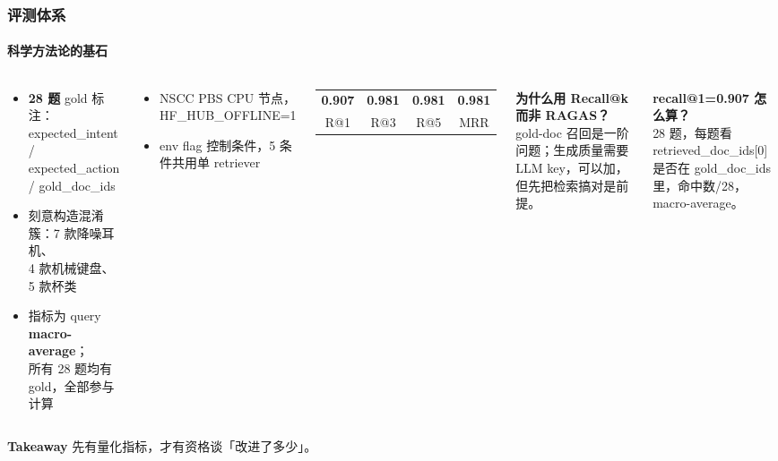 \documentclass[aspectratio=169,10pt]{beamer}
\newcommand{\takeaway}[1]{%
  \vfill%
  \begin{tcolorbox}[
    colback=Ctakebg, colframe=Ctakebg,
    arc=0pt, boxrule=0pt,
    left=7pt, right=7pt, top=4pt, bottom=4pt,
    width=\textwidth, nobeforeafter
  ]%
    {\scriptsize\color{white}\textbf{Takeaway}\enspace%
     \color{white!88!Ctakebg}#1}%
  \end{tcolorbox}%
}
\newcommand{\mono}[1]{{\ttfamily\small\color{Cblue!90!black}#1}}  %
\begin{document}
\begin{frame}
\frametitle{评测体系}
\framesubtitle{科学方法论的基石}

\begin{columns}[T]
\begin{tcolorbox}[tcgray, title={\color{Ctextdark}评测集设计}]
\small\begin{itemize}\setlength\itemsep{0.3em}
  \item \textbf{28 题} gold 标注：\\
    \mono{expected\_intent} / \mono{expected\_action}\\
    / \mono{gold\_doc\_ids}
  \item 刻意构造混淆簇：7 款降噪耳机、\\4 款机械键盘、5 款杯类
  \item 指标为 query \textbf{macro-average}；\\所有 28 题均有 gold，全部参与计算
\end{itemize}
\end{tcolorbox}
\vspace{0.2cm}
\begin{tcolorbox}[tcgray, title={\color{Ctextdark}执行环境}]
\small\begin{itemize}\setlength\itemsep{0.2em}
  \item NSCC PBS CPU 节点，\mono{HF\_HUB\_OFFLINE=1}
  \item env flag 控制条件，5 条件共用单 retriever
\end{itemize}
\end{tcolorbox}

\begin{tcolorbox}[tcgreen, title={\color{Cgreen}Baseline 结果}]
\vspace{0.1cm}\centering
\begin{tabular}{cccc}
{\large\bfseries\color{Cgreen}0.907} &
{\large\bfseries\color{Cgreen}0.981} &
{\large\bfseries\color{Cgreen}0.981} &
{\large\bfseries\color{Cgreen}0.981}\\
{\tiny R@1} & {\tiny R@3} & {\tiny R@5} & {\tiny MRR}
\end{tabular}
\end{tcolorbox}
\vspace{0.2cm}
\begin{tcolorbox}[tcblue]
\small\textbf{为什么用 Recall@k 而非 RAGAS？}\\[0.2em]
gold-doc 召回是一阶问题；生成质量需要 LLM key，可以加，但先把检索搞对是前提。
\end{tcolorbox}
\vspace{0.15cm}
\begin{tcolorbox}[tcgray]
\small\textbf{recall@1=0.907 怎么算？}\\
28 题，每题看 retrieved\_doc\_ids[0] 是否在 gold\_doc\_ids 里，命中数/28，macro-average。
\end{tcolorbox}
\end{columns}

\takeaway{先有量化指标，才有资格谈「改进了多少」。}
\end{frame}
\end{document}
